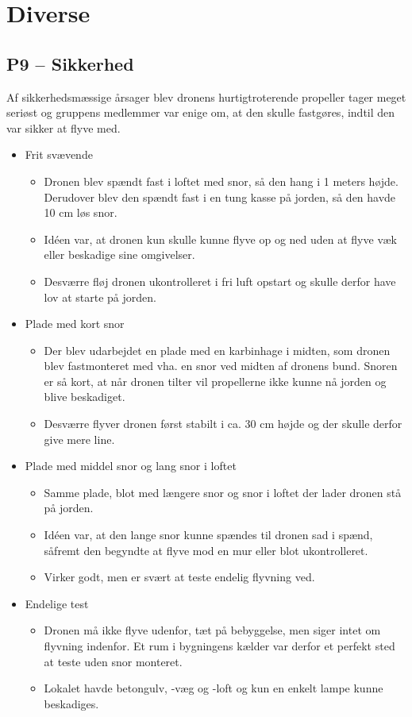 \documentclass[Main]{subfiles}
\begin{document}
\chapter{Diverse}
 
\section[Sikkerhed]{P9 -- Sikkerhed}
Af sikkerhedsmæssige årsager blev dronens hurtigtroterende propeller tager meget seriøst og gruppens medlemmer var enige om, at den skulle fastgøres, indtil den var sikker at flyve med.
\begin{itemize}
\item Frit svævende
	\begin{itemize}
	\item Dronen blev spændt fast i loftet med snor, så den hang i 1 meters højde. Derudover blev den spændt fast i en tung kasse på jorden, så den havde 10 cm løs snor. 
	\item Idéen var, at dronen kun skulle kunne flyve op og ned uden at flyve væk eller beskadige sine omgivelser.
	\item Desværre fløj dronen ukontrolleret i fri luft opstart og skulle derfor have lov at starte på jorden.
	\end{itemize}
	
\item Plade med kort snor
	\begin{itemize}
	\item Der blev udarbejdet en plade med en karbinhage i midten, som dronen blev fastmonteret med vha. en snor ved midten af dronens bund.
	Snoren er så kort, at når dronen tilter vil propellerne ikke kunne nå jorden og blive beskadiget.
	\item Desværre flyver dronen først stabilt i ca. 30 cm højde og der skulle derfor give mere line.
	\end{itemize}
	
\item Plade med middel snor og lang snor i loftet
	\begin{itemize}
	\item Samme plade, blot med længere snor og snor i loftet der lader dronen stå på jorden.
	\item Idéen var, at den lange snor kunne spændes til dronen sad i spænd, såfremt den begyndte at flyve mod en mur eller blot ukontrolleret.
	\item Virker godt, men er svært at teste endelig flyvning ved.
	\end{itemize}

\item Endelige test
	\begin{itemize}
	\item Dronen må ikke flyve udenfor, tæt på bebyggelse\cite{Lov1}, men siger intet om flyvning indenfor. 
	Et rum i bygningens kælder var derfor et perfekt sted at teste uden snor monteret.
	\item Lokalet havde betongulv, -væg og -loft og kun en enkelt lampe kunne beskadiges. 
	\end{itemize}
\end{itemize}
\end{document}
